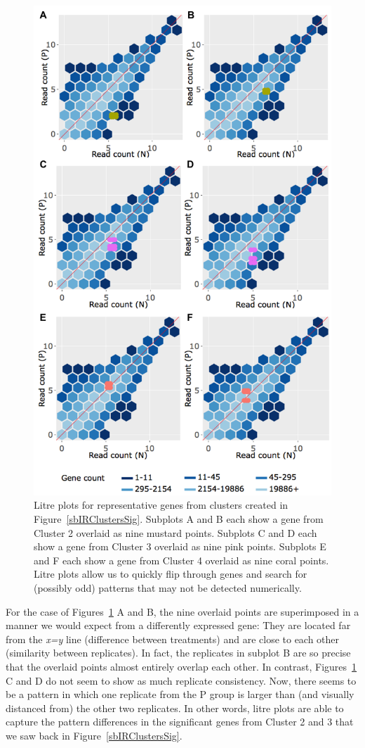 \documentclass[11pt,a4paper,oldfontcommands,openany]{memoir}
\numberwithin{equation}{section} %
\begin{document}
\begin{figure}[!tpb]
\begin{framed}
\centerline{\includegraphics[width=0.85\columnwidth]{MakeFigures/litre6LB.png}}
\end{framed}
\caption{Litre plots for representative genes from clusters created in Figure~\ref{sbIRClustersSig}. Subplots A and B each show a gene from Cluster 2 overlaid as nine mustard points. Subplots C and D each show a gene from Cluster 3 overlaid as nine pink points. Subplots E and F each show a gene from Cluster 4 overlaid as nine coral points. Litre plots allow us to quickly flip through genes and search for (possibly odd) patterns that may not be detected numerically.
\label{repDot}}
\end{figure}

For the case of Figures~\ref{repDot} A and B, the nine overlaid points are superimposed in a manner we would expect from a differently expressed gene: They are located far from the \textit{x=y} line (difference between treatments) and are close to each other (similarity between replicates). In fact, the replicates in subplot B are so precise that the overlaid points almost entirely overlap each other. In contrast, Figures~\ref{repDot} C and D do not seem to show as much replicate consistency. Now, there seems to be a pattern in which one replicate from the P group is larger than (and visually distanced from) the other two replicates. In other words, litre plots are able to capture the pattern differences in the significant genes from Cluster 2 and 3 that we saw back in Figure~\ref{sbIRClustersSig}.
\end{document}
